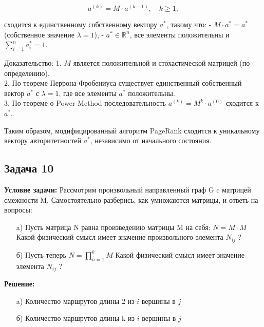 \documentclass[a4paper,12pt]{article}
\begin{document}
\[
a^{(k)} = M \cdot a^{(k-1)}, \quad k \geq 1,
\]

сходится к единственному собственному вектору \( a^* \), такому что:
- \( M \cdot a^* = a^* \) (собственное значение \( \lambda = 1 \)),
- \( a^* \in \mathbb{R}^n \), все элементы положительны и \( \sum_{i=1}^n a_i^* = 1 \).

Доказательство:
1. \( M \) является положительной и стохастической матрицей (по определению).\\
2. По теореме Перрона-Фробениуса существует единственный собственный вектор \( a^* \) с \( \lambda = 1 \), где все элементы \( a^* \) положительны.\\
3. По теореме о Power Method последовательность \( a^{(k)} = M^k \cdot a^{(0)} \) сходится к \( a^* \).

Таким образом, модифицированный алгоритм PageRank сходится к уникальному вектору авторитетностей \( a^* \), независимо от начального состояния.

\subsection{Задача 10}
\textbf{Условие задачи:}
Рассмотрим произвольный направленный граф G c матрицей смежности M. Самостоятельно разберись, как умножаются матрицы, и ответь на вопросы:
\begin{itemize}
    \item[a) ] Пусть матрица N равна произведению матрицы M на себя: $N = M\cdot M$ Какой физический смысл
    имеет значение произвольного элемента $N_{ij}$ ?
    \item[б) ] Пусть теперь $N=\prod_{n=1}^{k}M$ Какой физический смысл имеет значение элемента $N_{ij}$ ?
\end{itemize}
\textbf{Решение:}
\begin{itemize}
    \item[a) ] Количество маршрутов длины 2 из $i$ вершины в $j$ 
    \item[б) ] Количество маршрутов длины k из $i$ вершины в $j$
\end{itemize}
\end{document}
